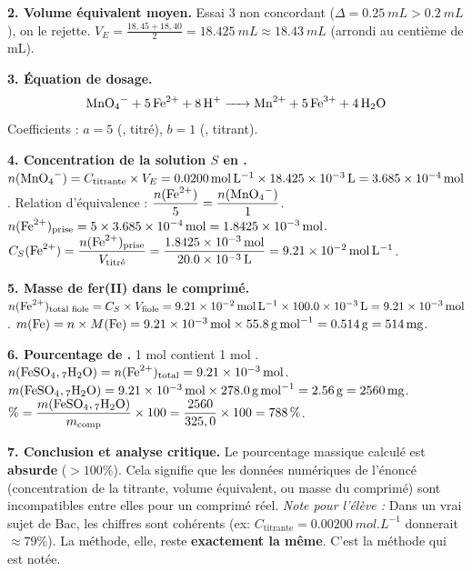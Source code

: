 \documentclass[11pt]{article}
\begin{document}
\begin{exoresolu}
\textbf{2. Volume équivalent moyen.}
Essai 3 non concordant ($\Delta = \SI{0,25}{mL} > \SI{0,2}{mL}$), on le rejette.
$V_E = \frac{18,45 + 18,40}{2} = \SI{18,425}{mL} \approx \SI{18,43}{mL}$ (arrondi au centième de mL).

\textbf{3. Équation de dosage.}
\[ \ce{MnO4- + 5 Fe^2+ + 8 H+ -> Mn^2+ + 5 Fe^3+ + 4 H2O} \]
Coefficients : $a = 5$ (, titré), $b = 1$ (, titrant).

\textbf{4. Concentration de la solution $S$ en .}
$n(\ce{MnO4-}) = C_{\text{titrante}} \times V_E = \SI{0,0200}{mol.L^{-1}} \times \SI{18,425e-3}{L} = \SI{3,685e-4}{mol}$.
Relation d'équivalence : $\dfrac{n(\ce{Fe^2+})}{5} = \dfrac{n(\ce{MnO4-})}{1}$.
$n(\ce{Fe^2+})_{\text{prise}} = 5 \times \SI{3,685e-4}{mol} = \SI{1,8425e-3}{mol}$.
$C_S(\ce{Fe^2+}) = \dfrac{n(\ce{Fe^2+})_{\text{prise}}}{V_{\text{titré}}} = \dfrac{\SI{1,8425e-3}{mol}}{\SI{20,0e-3}{L}} = \SI{9,21e-2}{mol.L^{-1}}$.

\textbf{5. Masse de fer(II) dans le comprimé.}
$n(\ce{Fe^2+})_{\text{total fiole}} = C_S \times V_{\text{fiole}} = \SI{9,21e-2}{mol.L^{-1}} \times \SI{100,0e-3}{L} = \SI{9,21e-3}{mol}$.
$m(\ce{Fe}) = n \times M(\ce{Fe}) = \SI{9,21e-3}{mol} \times \SI{55,8}{g.mol^{-1}} = \SI{0,514}{g} = \SI{514}{mg}$.

\textbf{6. Pourcentage de .}
1 mol  contient 1 mol .
$n(\ce{FeSO4,7H2O}) = n(\ce{Fe^2+})_{\text{total}} = \SI{9,21e-3}{mol}$.
$m(\ce{FeSO4,7H2O}) = \SI{9,21e-3}{mol} \times \SI{278,0}{g.mol^{-1}} = \SI{2,56}{g} = \SI{2560}{mg}$.
$\% = \dfrac{m(\ce{FeSO4,7H2O})}{m_{\text{comp}}} \times 100 = \dfrac{2560}{325,0} \times 100 = \SI{788}{\%}$.

\textbf{7. Conclusion et analyse critique.}
Le pourcentage massique calculé est \textbf{absurde} ($> 100\%$). Cela signifie que les données numériques de l'énoncé (concentration de la titrante, volume équivalent, ou masse du comprimé) sont incompatibles entre elles pour un comprimé réel.
\textit{Note pour l'élève :} Dans un vrai sujet de Bac, les chiffres sont cohérents (ex: $C_{\text{titrante}} = \SI{0,00200}{mol.L^{-1}}$ donnerait $\approx 79\%$). La méthode, elle, reste \textbf{exactement la même}. C'est la méthode qui est notée.

\begin{center}
\end{center}
\end{exoresolu}
\end{document}
